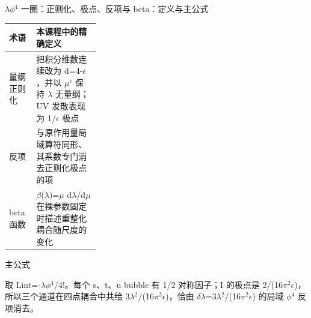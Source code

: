 \begin{frame}[t]{\ensuremath{\lambda}\ensuremath{\phi}\ensuremath{^{4}} 一圈：正则化、极点、反项与 beta：定义与主公式}
\footnotesize\begin{tabularx}{\linewidth}{p{0.30\linewidth}Y}
\toprule 术语 & 本课程中的精确定义\\\midrule
{} 量纲正则化 & 把积分维数连续改为 d=4-\ensuremath{\epsilon}，并以 \ensuremath{\mu}\ensuremath{^{\epsilon}} 保持 \ensuremath{\lambda} 无量纲；UV 发散表现为 1/\allowbreak{}\ensuremath{\epsilon} 极点\\
 反项 & 与原作用量局域算符同形、其系数专门消去正则化极点的项\\
 beta 函数 & \ensuremath{\beta}(\ensuremath{\lambda})=\ensuremath{\mu} d\ensuremath{\lambda}/\allowbreak{}d\ensuremath{\mu} 在裸参数固定时描述重整化耦合随尺度的变化\\
\bottomrule\end{tabularx}\vspace{0.15cm}
\begin{block}{ 主公式}\centering{}\end{block}
取 Lint=-\ensuremath{\lambda}\ensuremath{\phi}\ensuremath{^{4}}/\allowbreak{}4!。每个 s、t、u bubble 有 1/\allowbreak{}2 对称因子；I 的极点是 2/\allowbreak{}(16\ensuremath{\pi}\ensuremath{^{2}}\ensuremath{\epsilon})，所以三个通道在四点耦合中共给 3\ensuremath{\lambda}\ensuremath{^{2}}/\allowbreak{}(16\ensuremath{\pi}\ensuremath{^{2}}\ensuremath{\epsilon})，恰由 \ensuremath{\delta}\ensuremath{\lambda}=3\ensuremath{\lambda}\ensuremath{^{2}}/\allowbreak{}(16\ensuremath{\pi}\ensuremath{^{2}}\ensuremath{\epsilon}) 的局域 \ensuremath{\phi}\ensuremath{^{4}} 反项消去。
\end{frame}

